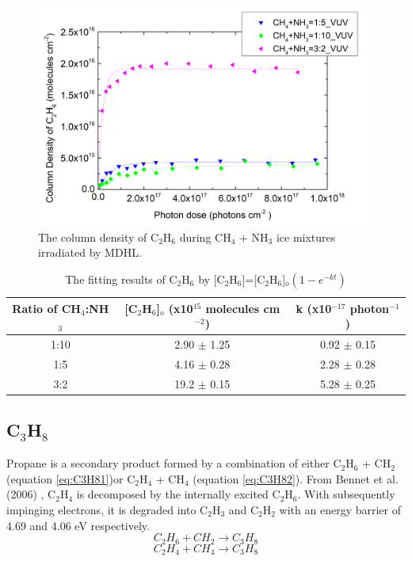 \begin{figure}
\centering
\includegraphics[width=\textwidth]{figures/chapter3/C2H6_rate_VUV.png}
\caption{The column density of C$_2$H$_6$ during CH$_4$ + NH$_3$ ice mixtures irradiated by MDHL. }
\label{fig:lab_C2H6}
\end{figure}

\begin{table}[htbp]
\caption{The fitting results of C$_2$H$_6$ by [C$_2$H$_6$]=[C$_2$H$_6$]$_o(1 - e^{-kt})$}
\label{tab:fittingC2H6}
\begin{tabular}{ccc}
\hline
\hline
Ratio of CH$_4$:NH$_3$ & [C$_2$H$_6$]$_o$ (x10$^{15}$ molecules cm$^{-2}$) & k (x10$^{-17}$ photon$^{-1}$) \\
\hline
1:10 & 2.90 $\pm$ 1.25 & 0.92 $\pm$ 0.15 \\
1:5 & 4.16 $\pm$ 0.28 & 2.28 $\pm$ 0.28 \\
3:2 & 19.2 $\pm$ 0.15 & 5.28 $\pm$ 0.25 \\
\hline
\end{tabular}
\end{table}


\subsection{C$_3$H$_8$}

Propane is a secondary product formed by a combination of either C$_2$H$_6$ + CH$_2$ (equation \ref{eq:C3H81})or C$_2$H$_4$ + CH$_4$ (equation \ref{eq:C3H82}). From Bennet et al. (2006) \cite{bennett2006laboratory}, C$_2$H$_4$ is decomposed by the internally excited C$_2$H$_6$. With subsequently impinging electrons, it is degraded into C$_2$H$_3$ and C$_2$H$_2$ with an energy barrier of 4.69 and 4.06 eV respectively.
\begin{equation}
C_2H_6 + CH_2 \rightarrow C_3H_8
\label{eq:C3H81}
\end{equation}
\begin{equation}
C_2H_4 + CH_4 \rightarrow C_3H_8
\label{eq:C3H82}
\end{equation}

